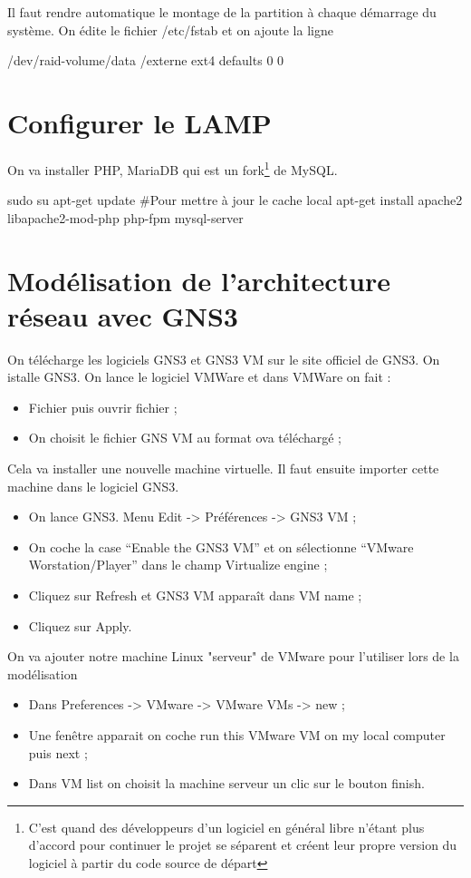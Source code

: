 \documentclass[a4paper,12pt,french]{report} %
\begin{document}
Il faut rendre automatique le montage de la partition à chaque démarrage du système. On édite le fichier /etc/fstab et on ajoute la ligne
\begin{exempleConsole}
/dev/raid-volume/data /externe ext4 defaults 0 0
\end{exempleConsole}

\section{Configurer le LAMP}
On va installer PHP, MariaDB qui est un fork\footnote{C'est quand des développeurs d'un logiciel en général libre n'étant plus d'accord pour continuer le projet se séparent et créent leur propre version du logiciel à partir du code source de départ} de MySQL.
\begin{exempleConsole}
sudo su
apt-get update #Pour mettre à jour le cache local
apt-get install apache2 libapache2-mod-php php-fpm mysql-server
\end{exempleConsole}

\section{Modélisation de l'architecture réseau avec GNS3}
	On télécharge les logiciels GNS3  et  GNS3 VM sur le site officiel de GNS3. On istalle GNS3.
On lance le logiciel VMWare et dans VMWare on fait :
\begin{itemize}
	\item Fichier puis ouvrir fichier ;
	\item  On choisit le fichier GNS VM au format ova téléchargé ;
\end{itemize}
Cela va installer une nouvelle machine virtuelle. Il faut ensuite importer cette machine dans le logiciel GNS3.
\begin{itemize}
	\item On lance GNS3. Menu Edit -> Préférences -> GNS3 VM ;
	\item On coche la case  “Enable the GNS3 VM” et on sélectionne “VMware Worstation/Player” dans le champ Virtualize engine ;
	\item Cliquez sur Refresh et GNS3 VM apparaît dans VM name ;
	\item Cliquez sur Apply.
\end{itemize}
On va ajouter notre machine Linux "serveur" de VMware pour l'utiliser lors de la modélisation
\begin{itemize}
	\item Dans Preferences -> VMware -> VMware VMs -> new ;
	\item Une fenêtre apparait on coche run this VMware VM on my local computer puis next ;
	\item Dans VM list on choisit la machine serveur un clic sur le bouton finish.
\end{itemize}
\end{document}

